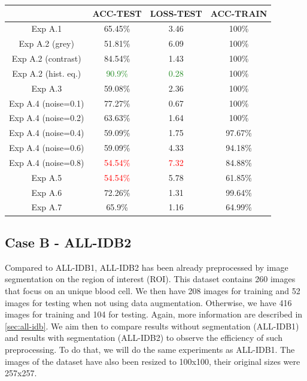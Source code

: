 \documentclass[11pt, openany]{report}
\theoremstyle{plain}
\theoremstyle{definition}
\theoremstyle{remark}
\begin{document}
\begin{center}
\begin{tabular}{|c|c|c|c|}
  \hline
          & \textbf{ACC-TEST} & \textbf{LOSS-TEST} & \textbf{ACC-TRAIN} \\
  \hline
  Exp A.1 & 65.45\% & 3.46 & 100\% \\
  \hline
  Exp A.2 (grey) & 51.81\% & 6.09 & 100\%  \\ 
  Exp A.2 (contrast) & 84.54\% & 1.43 & 100\% \\ 
  Exp A.2 (hist. eq.) & \textcolor{ForestGreen}{90.9\%} & \textcolor{ForestGreen}{0.28} & 100\% \\ 
  \hline
  Exp A.3 & 59.08\% & 2.36 & 100\% \\
  \hline
  Exp A.4 (noise=0.1) & 77.27\% & 0.67 & 100\%  \\ 
  Exp A.4 (noise=0.2) & 63.63\% & 1.64 & 100\% \\ 
  Exp A.4 (noise=0.4) & 59.09\% & 1.75 & 97.67\% \\
  Exp A.4 (noise=0.6) & 59.09\% & 4.33 & 94.18\%  \\ 
  Exp A.4 (noise=0.8) & \textcolor{red}{54.54\%} & \textcolor{red}{7.32} & 84.88\% \\
  \hline 
  Exp A.5 & \textcolor{red}{54.54\%} & 5.78 & 61.85\% \\
  \hline
  Exp A.6 & 72.26\% & 1.31 & 99.64\% \\
  \hline
  Exp A.7 & 65.9\% & 1.16 & 64.99\% \\ 
  \hline
\end{tabular}
\label{table:summary-allidb1}
\end{center}


\subsection{Case B - ALL-IDB2}

Compared to ALL-IDB1, ALL-IDB2 has been already preprocessed by image segmentation on the region of interest (ROI). This dataset contains 260 images that focus on an unique blood cell. We then have 208 images for training and 52 images for testing when not using data augmentation. Otherwise, we have 416 images for training and 104 for testing. Again, more information are described in \autoref{sec:all-idb}. We aim then to compare results without segmentation (ALL-IDB1) and results with segmentation (ALL-IDB2) to observe the efficiency of such preprocessing. To do that, we will do the same experiments as ALL-IDB1. The images of the dataset have also been resized to 100x100, their original sizes were 257x257.
\end{document}
